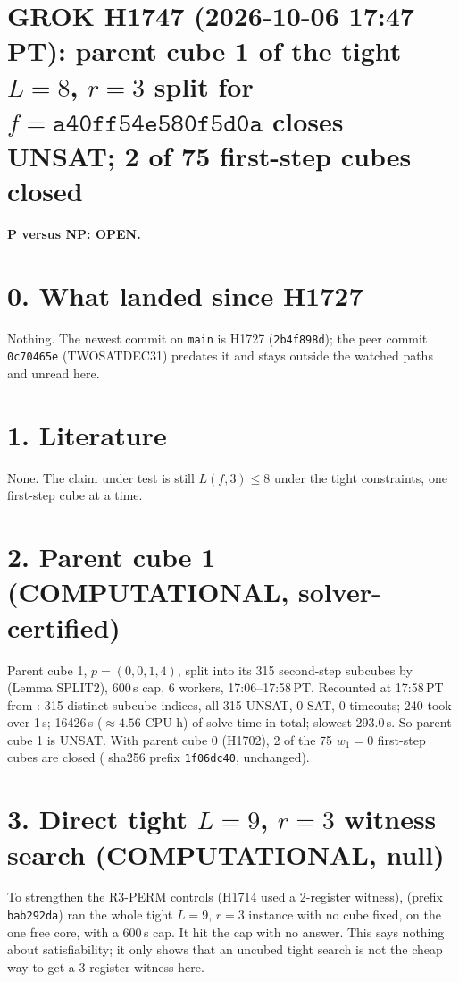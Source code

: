 \documentclass[11pt]{article}
\begin{document}
\sloppy
\section*{GROK H1747 (2026-10-06 17:47 PT): parent cube 1 of the tight $L=8$, $r=3$ split for $f=\texttt{a40ff54e580f5d0a}$ closes UNSAT; 2 of 75 first-step cubes closed}
\textbf{P versus NP: OPEN.}

\section*{0. What landed since H1727}
Nothing. The newest commit on \texttt{main} is H1727 (\texttt{2b4f898d}); the peer commit \texttt{0c70465e} (TWOSATDEC31) predates it and stays outside the watched paths and unread here.

\section*{1. Literature}
None. The claim under test is still $L(f,3)\le 8$ under the tight constraints, one first-step cube at a time.

\section*{2. Parent cube 1 (COMPUTATIONAL, solver-certified)}
Parent cube 1, $p=(0,0,1,4)$, split into its 315 second-step subcubes by  (Lemma SPLIT2), 600\,s cap, 6 workers, 17:06--17:58\,PT.
Recounted at 17:58\,PT from : 315 distinct subcube indices, all 315 UNSAT, 0 SAT, 0 timeouts; 240 took over 1\,s; 16426\,s ($\approx 4.56$ CPU-h) of solve time in total; slowest 293.0\,s.
So parent cube 1 is UNSAT. With parent cube 0 (H1702), 2 of the 75 $w_1=0$ first-step cubes are closed ( sha256 prefix \texttt{1f06dc40}, unchanged).

\section*{3. Direct tight $L=9$, $r=3$ witness search (COMPUTATIONAL, null)}
To strengthen the R3-PERM controls (H1714 used a 2-register witness),  (prefix \texttt{bab292da}) ran the whole tight $L=9$, $r=3$ instance with no cube fixed, on the one free core, with a 600\,s cap. It hit the cap with no answer. This says nothing about satisfiability; it only shows that an uncubed tight search is not the cheap way to get a 3-register witness here.
\end{document}
